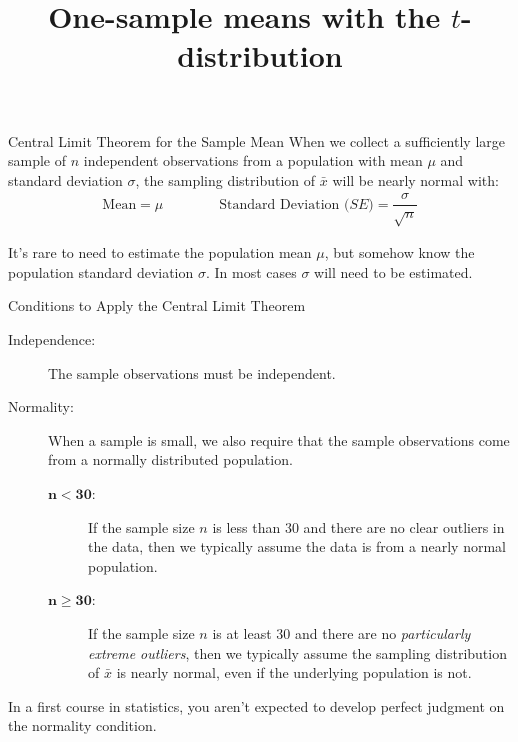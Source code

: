 \documentclass{beamer}
\title[MA205 - Section 7.1]{One-sample means with the $t$-distribution}
\begin{document}
\begin{frame}
  \titlepage
\end{frame}

\begin{frame}
  \begin{block}{Central Limit Theorem for the Sample Mean}
    When we collect a sufficiently large sample of $n$ independent observations from a population with mean $\mu$ and standard deviation $\sigma$, the sampling distribution of $\bar{x}$ will be nearly normal with:
    \begin{equation*}
      \begin{aligned}
        \text{Mean} = \mu
        \qquad\qquad
        \text{Standard Deviation ($SE$)} = \dfrac{\sigma}{\sqrt{n}}
      \end{aligned}
    \end{equation*}
  \end{block}\pause

  \begin{note}
    It's rare to need to estimate the population mean $\mu$, but somehow know the population standard deviation $\sigma$. In most cases $\sigma$ will need to be estimated.
  \end{note}
\end{frame}

\begin{frame}
  \begin{block}{Conditions to Apply the Central Limit Theorem}
    \begin{description}
    \item[Independence:] The sample observations must be independent.\pause
    \item[Normality:] When a sample is small, we also require that the sample observations come from a normally distributed population.\pause
      \begin{description}
      \item[$\boldsymbol{n<30}$:] If the sample size $n$ is less than 30 and there are no clear outliers in the data, then we typically assume the data is from a nearly normal population.\pause
      \item[$\boldsymbol{n\geq30}$:] If the sample size $n$ is at least 30 and there are no \emph{particularly extreme outliers}, then we typically assume the sampling distribution of $\bar{x}$ is nearly normal, even if the underlying population is not.
      \end{description}
    \end{description}
  \end{block}\pause
  
  \begin{note}
    In a first course in statistics, you aren't expected to develop perfect judgment on the normality condition.
  \end{note}
\end{frame}
\end{document}
